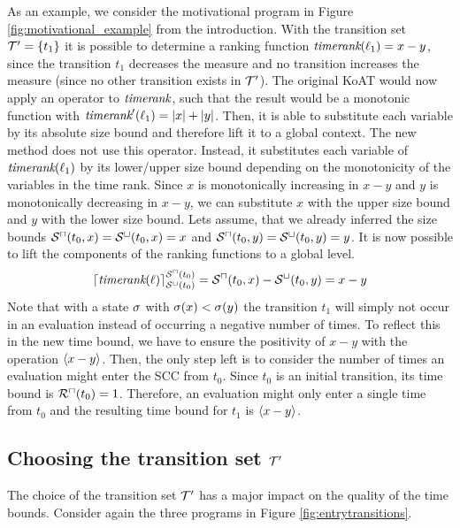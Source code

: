 \begin{example}[TimeBounds]
  
  As an example, we consider the motivational program in Figure \ref{fig:motivational_example} from the introduction.
  With the transition set $\mathcal{T}' = \lbrace t_1 \rbrace$ it is possible to determine a ranking function $\emph{timerank}(\ell_1) = x - y$, since the transition $t_1$ decreases the measure and no transition increases the measure (since no other transition exists in $\mathcal{T}'$).
  The original KoAT would now apply an operator to $\emph{timerank}$, such that the result would be a monotonic function with $\emph{timerank}'(\ell_1) = \left|x\right| + \left|y\right|$.
  Then, it is able to substitute each variable by its absolute size bound and therefore lift it to a global context.
  The new method does not use this operator.
  Instead, it substitutes each variable of $\emph{timerank}(\ell_1)$ by its lower/upper size bound depending on the monotonicity of the variables in the time rank.
  Since $x$ is monotonically increasing in $x-y$ and $y$ is monotonically decreasing in $x-y$, we can substitute $x$ with the upper size bound and $y$ with the lower size bound.
  Lets assume, that we already inferred the size bounds ${\mathcal{S}^\sqcap}(t_0,x) = {\mathcal{S}^\sqcup}(t_0,x) = x$ and ${\mathcal{S}^\sqcap}(t_0,y) = {\mathcal{S}^\sqcup}(t_0,y) = y$.
  It is now possible to lift the components of the ranking functions to a global level.
  \[ \lceil \emph{timerank}(\ell) \rceil^{{\mathcal{S}^\sqcap}(t_0)}_{{\mathcal{S}^\sqcup}(t_0)} = {\mathcal{S}^\sqcap}(t_0, x) - {\mathcal{S}^\sqcup}(t_0, y) = x - y \]
  Note that with a state $\sigma$ with $\sigma(x) < \sigma(y)$ the transition $t_1$ will simply not occur in an evaluation instead of occurring a negative number of times.
  To reflect this in the new time bound, we have to ensure the positivity of $x - y$ with the operation $\langle x - y\rangle$.
  Then, the only step left is to consider the number of times an evaluation might enter the SCC from $t_0$.
  Since $t_0$ is an initial transition, its time bound is ${\mathcal{R}^\sqcap}(t_0) = 1$.
  Therefore, an evaluation might only enter a single time from $t_0$ and the resulting time bound for $t_1$ is $\langle x - y\rangle$.
\end{example}

\subsection{Choosing the transition set $\mathcal{T}'$}

The choice of the transition set $\mathcal{T}'$ has a major impact on the quality of the time bounds.
Consider again the three programs in Figure \ref{fig:entrytransitions}.

